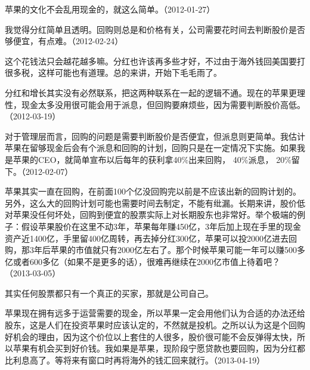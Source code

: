 
苹果的文化不会乱用现金的，就这么简单。（2012-01-27）


我觉得分红简单且透明。回购则总是和价格有关，公司需要花时间去判断股价是否够便宜，有点难。（2012-02-24）


这个花钱法只会越花越多嘛。分红也许该再多些才好，不过由于海外钱回美国要打很多税，这样可能也有道理。总的来讲，开始下毛毛雨了。

分红和增长其实没有必然联系，把这两种联系在一起的逻辑不通。现在的苹果更理性，现金太多没用很可能会用于派息，但回购要麻烦些，因为需要判断股价高低。（2012-03-19）


对于管理层而言，回购的问题是需要判断股价是否便宜，但派息则更简单。我估计苹果在留够现金后会有个派息和回购的计划，回购只是在一定情况下实施。如果我是苹果的CEO，就简单宣布以后每年的获利拿40\%出来回购， 40\%派息， 20\%留下。（2012-02-07）


苹果其实一直在回购，在前面100个亿没回购完以前是不应该出新的回购计划的。另外，这么大的回购计划可能也需要时间去制定，不能有纰漏。长期来讲，股价低对苹果没任何坏处，回购到便宜的股票实际上对长期股东也非常好。举个极端的例子：假设苹果股价在这里不动3年，苹果每年赚450亿，3年后加上现在手里的现金资产近1400亿，手里留400亿周转，再去掉分红300亿，苹果可以投2000亿进去回购，那3年后苹果的市值就只有2000亿左右了。那个时候苹果可能一年可以赚500多亿或者600多亿（如果不是更多的话），很难再继续在2000亿市值上待着吧？（2013-03-05）


其实任何股票都只有一个真正的买家，那就是公司自己。

苹果现在拥有远多于运营需要的现金，所以苹果一定会用他们认为合适的办法还给股东，这是人们在投资苹果时应该认定的，不然就是投机。之所以认为这是个回购好机会的理由，因为这个价位以上套住的人很多，股价很可能不会反弹得太快，所以苹果有机会买到好价钱。我如果是苹果，现阶段宁愿贷款也要回购，因为分红都比利息高了。等将来有窗口时再将海外的钱汇回来就行。（2013-04-19）

